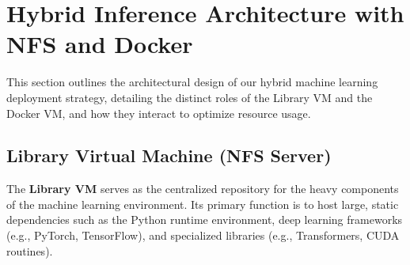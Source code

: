 \documentclass[11pt,a4paper]{article}
\begin{document}


\section{Hybrid Inference Architecture with NFS and Docker}

This section outlines the architectural design of our hybrid machine learning deployment strategy, detailing the distinct roles of the Library VM and the Docker VM, and how they interact to optimize resource usage.

\subsection{Library Virtual Machine (NFS Server)}

The \textbf{Library VM} serves as the centralized repository for the heavy components of the machine learning environment. Its primary function is to host large, static dependencies such as the Python runtime environment, deep learning frameworks (e.g., PyTorch, TensorFlow), and specialized libraries (e.g., Transformers, CUDA routines).
\end{document}
